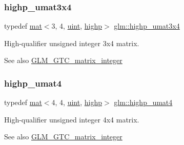 \subsubsection{\texorpdfstring{highp\+\_\+umat3x4}{highp\_umat3x4}}
{\footnotesize\ttfamily typedef \hyperlink{structglm_1_1mat}{mat}$<$3, 4, \hyperlink{group__core__precision_ga4fd29415871152bfb5abd588334147c8}{uint}, \hyperlink{namespaceglm_a36ed105b07c7746804d7fdc7cc90ff25ac6f7eab42eacbb10d59a58e95e362074}{highp}$>$ \hyperlink{group__gtc__matrix__integer_ga6df8a72a571bcd26ade637bf069b5562}{glm\+::highp\+\_\+umat3x4}}

High-\/qualifier unsigned integer 3x4 matrix. \begin{DoxySeeAlso}{See also}
\hyperlink{group__gtc__matrix__integer}{G\+L\+M\+\_\+\+G\+T\+C\+\_\+matrix\+\_\+integer} 
\end{DoxySeeAlso}
\mbox{\label{group__gtc__matrix__integer_ga9bc7b9ba044449b412119fa68cf11b20}} 
\subsubsection{\texorpdfstring{highp\+\_\+umat4}{highp\_umat4}}
{\footnotesize\ttfamily typedef \hyperlink{structglm_1_1mat}{mat}$<$4, 4, \hyperlink{group__core__precision_ga4fd29415871152bfb5abd588334147c8}{uint}, \hyperlink{namespaceglm_a36ed105b07c7746804d7fdc7cc90ff25ac6f7eab42eacbb10d59a58e95e362074}{highp}$>$ \hyperlink{group__gtc__matrix__integer_ga9bc7b9ba044449b412119fa68cf11b20}{glm\+::highp\+\_\+umat4}}

High-\/qualifier unsigned integer 4x4 matrix. \begin{DoxySeeAlso}{See also}
\hyperlink{group__gtc__matrix__integer}{G\+L\+M\+\_\+\+G\+T\+C\+\_\+matrix\+\_\+integer} 
\end{DoxySeeAlso}
\mbox{\label{group__gtc__matrix__integer_gaf56fa20818ea9c18fd0a4a8bf141a738}} 
